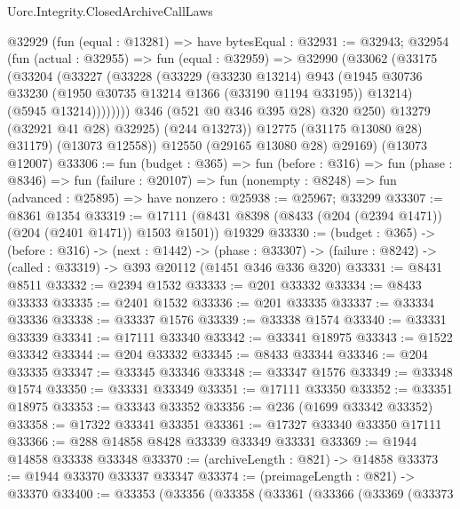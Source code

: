 \begin{lexlean}{Uorc.Integrity.ClosedArchiveCallLaws}
\begin{coremodule}
            @32929
              (fun (equal : @13281) =>
              have bytesEqual : @32931 := @32943;
              @32954
                (fun (actual : @32955) =>
                fun (equal : @32959) =>
                @32990
                  (@33062
                    (@33175
                      (@33204
                        (@33227
                          (@33228
                            (@33229
                              (@33230 @13214)
                              @943
                              (@1945
                                @30736
                                @33230
                                (@1950 @30735 @13214 @1366 (@33190 @1194 @33195))
                                @13214)
                              (@5945 @13214))))))))
                @346
                (@521 @0 @346 @395 @28)
                @320
                @250)
              @13279
              (@32921 @41 @28)
              @32925)
            (@244 @13273))
          @12775
          (@31175 @13080 @28)
          @31179)
        (@13073 @12558))
      @12550
      (@29165 @13080 @28)
      @29169)
    (@13073 @12007)
@33306 := fun (budget : @365) =>
  fun (before : @316) =>
  fun (phase : @8346) =>
  fun (failure : @20107) =>
  fun (nonempty : @8248) => fun (advanced : @25895) => have nonzero : @25938 := @25967; @33299
@33307 := @8361 @1354
@33319 := @17111 (@8431 @8398 (@8433 (@204 (@2394 @1471)) (@204 (@2401 @1471)) @1503 @1501)) @19329
@33330 := (budget : @365) ->
  (before : @316) ->
  (next : @1442) ->
  (phase : @33307) -> (failure : @8242) -> (called : @33319) -> @393 @20112 (@1451 @346 @336 @320)
@33331 := @8431 @8511
@33332 := @2394 @1532
@33333 := @201 @33332
@33334 := @8433 @33333
@33335 := @2401 @1532
@33336 := @201 @33335
@33337 := @33334 @33336
@33338 := @33337 @1576
@33339 := @33338 @1574
@33340 := @33331 @33339
@33341 := @17111 @33340
@33342 := @33341 @18975
@33343 := @1522 @33342
@33344 := @204 @33332
@33345 := @8433 @33344
@33346 := @204 @33335
@33347 := @33345 @33346
@33348 := @33347 @1576
@33349 := @33348 @1574
@33350 := @33331 @33349
@33351 := @17111 @33350
@33352 := @33351 @18975
@33353 := @33343 @33352
@33356 := @236 (@1699 @33342 @33352)
@33358 := @17322 @33341 @33351
@33361 := @17327 @33340 @33350 @17111
@33366 := @288 @14858 @8428 @33339 @33349 @33331
@33369 := @1944 @14858 @33338 @33348
@33370 := (archiveLength : @821) -> @14858
@33373 := @1944 @33370 @33337 @33347
@33374 := (preimageLength : @821) -> @33370
@33400 := @33353
    (@33356
      (@33358
        (@33361
          (@33366
            (@33369
              (@33373

\end{coremodule}
\end{lexlean}

